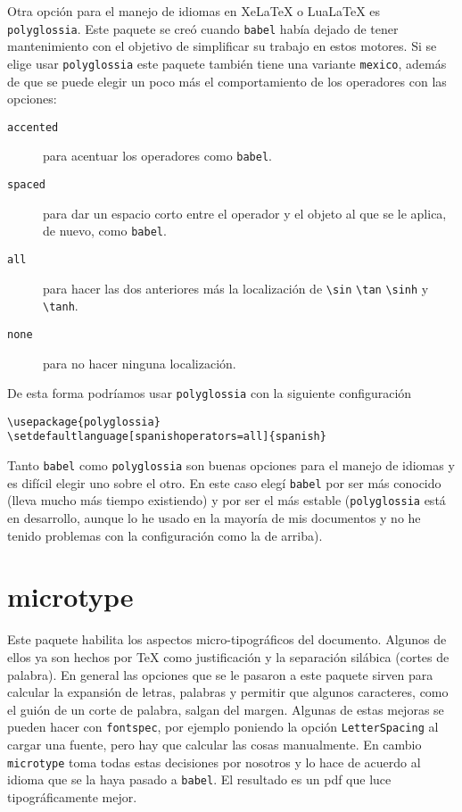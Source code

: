 Otra opción para el manejo de idiomas en Xe\LaTeX{} o Lua\LaTeX{} es
\texttt{polyglossia}. Este paquete se creó cuando \texttt{babel} había
dejado de tener mantenimiento con el objetivo de simplificar su trabajo en
estos motores. Si se elige usar \texttt{polyglossia} este paquete también
tiene una variante \texttt{mexico}, además de que se puede elegir un poco
más el comportamiento de los operadores con las opciones:
\begin{description}
  \item[\texttt{accented}] para acentuar los operadores como \texttt{babel}.
  \item[\texttt{spaced}] para dar un espacio corto entre el operador y el objeto al que se le aplica, de nuevo, como \texttt{babel}.
  \item[\texttt{all}] para hacer las dos anteriores más la localización de \verb|\sin| \verb|\tan| \verb|\sinh| y \verb|\tanh|.
  \item[\texttt{none}] para no hacer ninguna localización.
\end{description}
De esta forma podríamos usar \texttt{polyglossia} con la siguiente
configuración
\begin{flushleft}
  \verb|\usepackage{polyglossia}| \\
  \verb|\setdefaultlanguage[spanishoperators=all]{spanish}|
\end{flushleft}

Tanto \texttt{babel} como \texttt{polyglossia} son buenas opciones para el
manejo de idiomas y es difícil elegir uno sobre el otro. En este caso elegí
\texttt{babel} por ser más conocido (lleva mucho más tiempo existiendo) y
por ser el más estable (\texttt{polyglossia} está en desarrollo, aunque lo
he usado en la mayoría de mis documentos y no he tenido problemas con la
configuración como la de arriba).


\section{microtype}
Este paquete habilita los aspectos micro-tipográficos del documento. Algunos
de ellos ya son hechos por \TeX{} como justificación y la separación
silábica (cortes de palabra). En general las opciones que se le pasaron a
este paquete sirven para calcular la expansión de letras, palabras y
permitir que algunos caracteres, como el guión de un corte de palabra,
salgan del margen. Algunas de estas mejoras se pueden hacer con
\texttt{fontspec}, por ejemplo poniendo la opción \texttt{LetterSpacing} al
cargar una fuente, pero hay que calcular las cosas manualmente. En cambio
\texttt{microtype} toma todas estas decisiones por nosotros y lo hace
de acuerdo al idioma que se la haya pasado a \texttt{babel}. El resultado es
un pdf que luce tipográficamente mejor.


